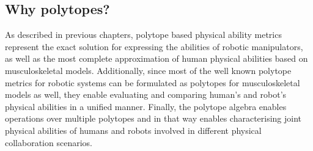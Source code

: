 

\subsection{Why polytopes?}

As described in previous chapters, polytope based physical ability metrics represent the exact solution for expressing the abilities of robotic manipulators, as well as the most complete approximation of human physical abilities based on musculoskeletal models. Additionally, since most of the well known polytope metrics for robotic systems can be formulated as polytopes for musculoskeletal models as well, they enable evaluating and comparing human's and robot's physical abilities in a unified manner. Finally, the polytope algebra enables operations over multiple polytopes and in that way enables characterising joint physical abilities of humans and robots involved in different physical collaboration scenarios. 

